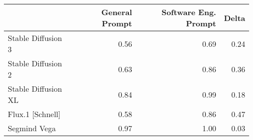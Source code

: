 \begin{tabular}{lrrr}
\toprule
 & General Prompt & Software Eng. Prompt & Delta \\
\midrule
Stable Diffusion 3 & 0.56 & 0.69 & 0.24 \\
Stable Diffusion 2 & 0.63 & 0.86 & 0.36 \\
Stable Diffusion XL & 0.84 & 0.99 & 0.18 \\
Flux.1 [Schnell] & 0.58 & 0.86 & 0.47 \\
Segmind Vega & 0.97 & 1.00 & 0.03 \\
\bottomrule
\end{tabular}
